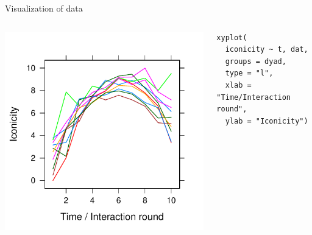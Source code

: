 \documentclass[aspectratio=169]{beamer}
\begin{document}
\begin{frame}[fragile]{Visualization of data}
  \begin{columns}
    \begin{column}{.5\textwidth}
      \includegraphics[scale=.8]{../figures/icon}
    \end{column}
    \begin{column}{.5\textwidth}
      \begin{lstlisting}
xyplot(
  iconicity ~ t, dat,
  groups = dyad,
  type = "l",
  xlab = "Time/Interaction round",
  ylab = "Iconicity")
      \end{lstlisting}
    \end{column}
  \end{columns}
\end{frame}
\end{document}
